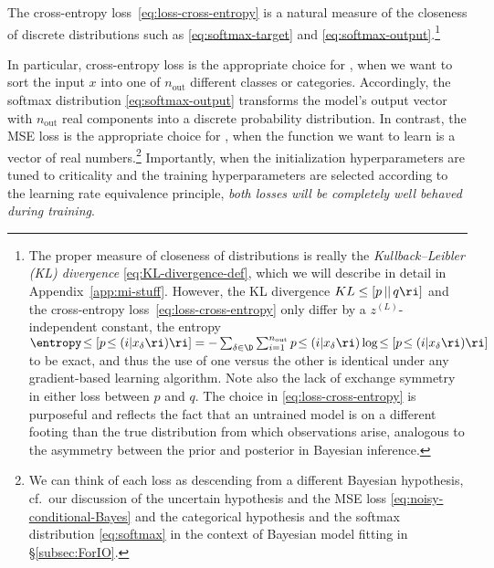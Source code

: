 The cross-entropy loss~\eqref{eq:loss-cross-entropy} is a natural measure of the closeness of discrete distributions such as \eqref{eq:softmax-target} and \eqref{eq:softmax-output}.\footnote{\label{foot:KL-in-KL-chapter}The proper measure of closeness of distributions is really the \emph{Kullback–Leibler (KL) divergence} \eqref{eq:KL-divergence-def}, which we will describe in detail in Appendix~\ref{app:mi-stuff}. However, the KL divergence $KL\le[ p \, ||\, q \ri]$ and the cross-entropy loss~\eqref{eq:loss-cross-entropy} only differ by a $z^{(L)}$-independent constant, the entropy $\entropy\!\le[p\!\le(i|x_\delta\ri) \ri] = -\sum_{\delta \in \D} \sum_{i=1}^{n_\text{out}} p\!\le(i|x_\delta\ri) \log\!\le[p\!\le(i|x_\delta\ri)\ri]$ to be exact, and thus the use of one versus the other is identical under any gradient-based learning algorithm. Note also the lack of exchange symmetry in either loss between $p$ and $q$. The choice in \eqref{eq:loss-cross-entropy} is purposeful and reflects the fact that an untrained model is on a different footing than the true distribution from which observations arise, analogous to the asymmetry between the prior and posterior in Bayesian inference.\label{footnote:KL}}


In particular, cross-entropy loss is the appropriate choice for , when we want to sort the input $x$ into one of $n_\text{out}$ different classes or categories. Accordingly, the softmax distribution \eqref{eq:softmax-output} transforms the model's output vector with $n_\text{out}$ real components into a discrete probability distribution.
In contrast, the MSE loss is the appropriate choice for , when the function we want to learn is a vector of real numbers.\footnote{We can think of each loss as descending from a different Bayesian hypothesis, cf.~our discussion of the uncertain hypothesis and the MSE loss \eqref{eq:noisy-conditional-Bayes}  and the categorical hypothesis and the softmax distribution \eqref{eq:softmax}  in the context of Bayesian model fitting in \S\ref{subsec:ForIO}.} Importantly, when the initialization hyperparameters are tuned to criticality and the training hyperparameters are selected according to the learning rate equivalence principle, \emph{both losses will be completely well behaved during training}.






